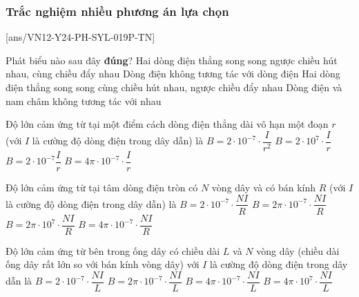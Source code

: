 \subsubsection{Trắc nghiệm nhiều phương án lựa chọn}
\setcounter{ex}{0}
[ans/VN12-Y24-PH-SYL-019P-TN]
\begin{ex}
	Phát biểu nào sau đây \textbf{đúng}?
	\choice
	{Hai dòng điện thẳng song song ngược chiều hút nhau, cùng chiều đẩy nhau}
	{Dòng điện không tương tác với dòng điện}
	{\True Hai dòng điện thẳng song song cùng chiều hút nhau, ngược chiều đẩy nhau}
	{Dòng điện và nam châm không tương tác với nhau}
	\loigiai{}
\end{ex}
\begin{ex}
	Độ lớn cảm ứng từ tại một điểm cách dòng điện thẳng dài vô hạn một đoạn $r$ (với $I$ là cường độ dòng điện trong dây dẫn) là
	\choice
	{$B=2 \cdot 10^{-7}\cdot\dfrac{I}{r^2}$}
	{$B=2 \cdot 10^7 \cdot\dfrac{I}{r}$}
	{\True $B=2 \cdot 10^{-7} \dfrac{I}{r}$}
	{$B=4 \pi \cdot 10^{-7} \cdot\dfrac{I}{r}$}
	\loigiai{}
\end{ex}
\begin{ex}
	Độ lớn cảm ứng từ tại tâm dòng điện tròn có $N$ vòng dây và có bán kính $R$ (với $I$ là cường độ dòng điện trong dây dẫn) là
	\choice
	{$B=2 \cdot 10^{-7} \cdot\dfrac{NI}{R}$}
	{\True $B=2 \pi \cdot 10^{-7}\cdot \dfrac{NI}{R}$}
	{$B=2 \pi \cdot 10^7 \cdot\dfrac{NI}{R}$}
	{$B=4 \pi \cdot 10^{-7}\cdot \dfrac{NI}{R}$}
	\loigiai{}
\end{ex}
\begin{ex}
	Độ lớn cảm ứng từ bên trong ống dây có chiều dài $L$ và $N$ vòng dây (chiều dài ống dây rất lớn so với bán kính vòng dây) với $I$ là cường độ dòng điện trong dây dẫn là
	\choice
	{$B=2 \cdot 10^{-7} \cdot\dfrac{NI}{L}$}
	{$B=2 \pi \cdot 10^{-7} \cdot\dfrac{NI}{L}$}
	{\True $B=4 \pi \cdot 10^{-7}\cdot \dfrac{NI}{L}$}
	{$B=4 \pi \cdot 10^7\cdot \dfrac{NI}{L}$}
	\loigiai{}
\end{ex}


